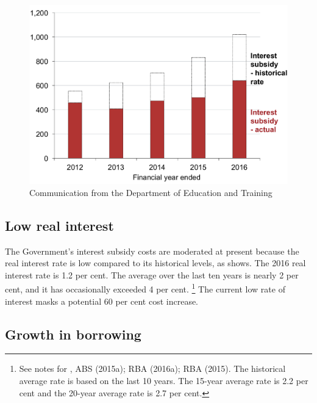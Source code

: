 \documentclass[embargoed]{grattan}
\begin{document}
\begin{figure}
\begin{minipage}[t][\textheight]{\columnwidth}
\includegraphics[page=3]{atlas/Chartpack.pdf}
%
{Communication from the Department of Education and Training}
\end{minipage}
\end{figure}

\subsection{Low real interest}\label{low-real-interest}

The Government's interest subsidy costs are moderated at present because the real interest rate is low compared to its historical levels, as  shows.
The 2016 real interest rate is 1.2 per cent.
The average over the last ten years is nearly 2 per cent, and it has occasionally exceeded 4 per cent.%
\footnote{See notes for , ABS (2015a); RBA (2016a); RBA (2015).
The historical average rate is based on the last 10 years.
The 15-year average rate is 2.2 per cent and the 20-year average rate is 2.7 per cent.} The current low rate of interest masks a potential 60 per cent cost increase.

\subsection{Growth in borrowing}\label{growth-in-borrowing} 
\end{document}
